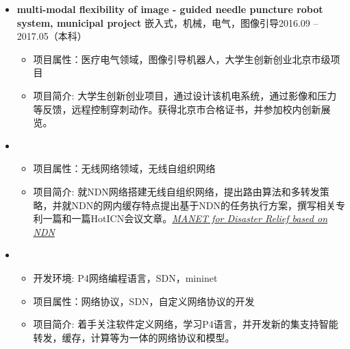   \begin{itemize}[leftmargin=*]
    \item
      \textbf{multi-modal flexibility of image - guided needle puncture robot system, municipal project}
      \ressubsingleline{} {嵌入式，机械，电气，图像引导}{2016.09 -- 2017.05（本科）}
     
      {\small
      \begin{itemize}
        \item 项目属性：医疗电气领域，图像引导机器人，大学生创新创业北京市级项目
        \item 项目简介: 大学生创新创业项目，通过设计该机电系统，通过影像和压力等反馈，远程控制穿刺动作。获得北京市合格证书，并参加校内创新展览。
      \end{itemize}
      }
  \item 
	{\small
		\begin{itemize}
			\item 项目属性：无线网络领域，无线自组织网络
			\item 项目简介: 就NDN网络搭建无线自组织网络，提出路由算法和多转发策略，并就NDN的网内缓存特点提出基于NDN的任务执行方案，撰写相关专利一篇和一篇HotICN会议文章。\href{https://ieeexplore.ieee.org/document/8605969} {\textit{MANET for Disaster Relief based on NDN}}
		\end{itemize}
	}
  \item 
		{\small
		\begin{itemize}
			\item 开发环境: P4网络编程语言，SDN，mininet
			\item 项目属性：网络协议，SDN，自定义网络协议的开发
			\item 项目简介: 着手关注软件定义网络，学习P4语言，并开发新的集支持智能转发，缓存，计算等为一体的网络协议和模型。
		\end{itemize}
	}
  \end{itemize}